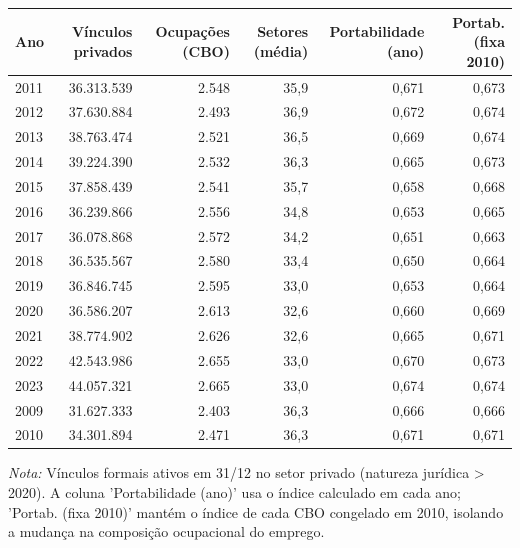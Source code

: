 \providecommand{\toprule}{\hline\hline}
\providecommand{\midrule}{\hline}
\providecommand{\bottomrule}{\hline\hline}
\providecommand{\addlinespace}[1][]{}
{\small
\renewcommand{\arraystretch}{1.12}
\begin{tabular}{lrrrrr}
\toprule
Ano & Vínculos privados & Ocupações (CBO) & Setores (média) & Portabilidade (ano) & Portab. (fixa 2010) \\
\midrule
2011 & 36.313.539 & 2.548 & 35,9 & 0,671 & 0,673 \\
2012 & 37.630.884 & 2.493 & 36,9 & 0,672 & 0,674 \\
2013 & 38.763.474 & 2.521 & 36,5 & 0,669 & 0,674 \\
2014 & 39.224.390 & 2.532 & 36,3 & 0,665 & 0,673 \\
2015 & 37.858.439 & 2.541 & 35,7 & 0,658 & 0,668 \\
2016 & 36.239.866 & 2.556 & 34,8 & 0,653 & 0,665 \\
2017 & 36.078.868 & 2.572 & 34,2 & 0,651 & 0,663 \\
2018 & 36.535.567 & 2.580 & 33,4 & 0,650 & 0,664 \\
2019 & 36.846.745 & 2.595 & 33,0 & 0,653 & 0,664 \\
2020 & 36.586.207 & 2.613 & 32,6 & 0,660 & 0,669 \\
2021 & 38.774.902 & 2.626 & 32,6 & 0,665 & 0,671 \\
2022 & 42.543.986 & 2.655 & 33,0 & 0,670 & 0,673 \\
2023 & 44.057.321 & 2.665 & 33,0 & 0,674 & 0,674 \\
2009 & 31.627.333 & 2.403 & 36,3 & 0,666 & 0,666 \\
2010 & 34.301.894 & 2.471 & 36,3 & 0,671 & 0,671 \\
\bottomrule
\end{tabular}
\vspace{2pt}
\par{\footnotesize \textit{Nota:} Vínculos formais ativos em 31/12 no setor privado (natureza jurídica > 2020). A coluna 'Portabilidade (ano)' usa o índice calculado em cada ano; 'Portab. (fixa 2010)' mantém o índice de cada CBO congelado em 2010, isolando a mudança na composição ocupacional do emprego.}
}
